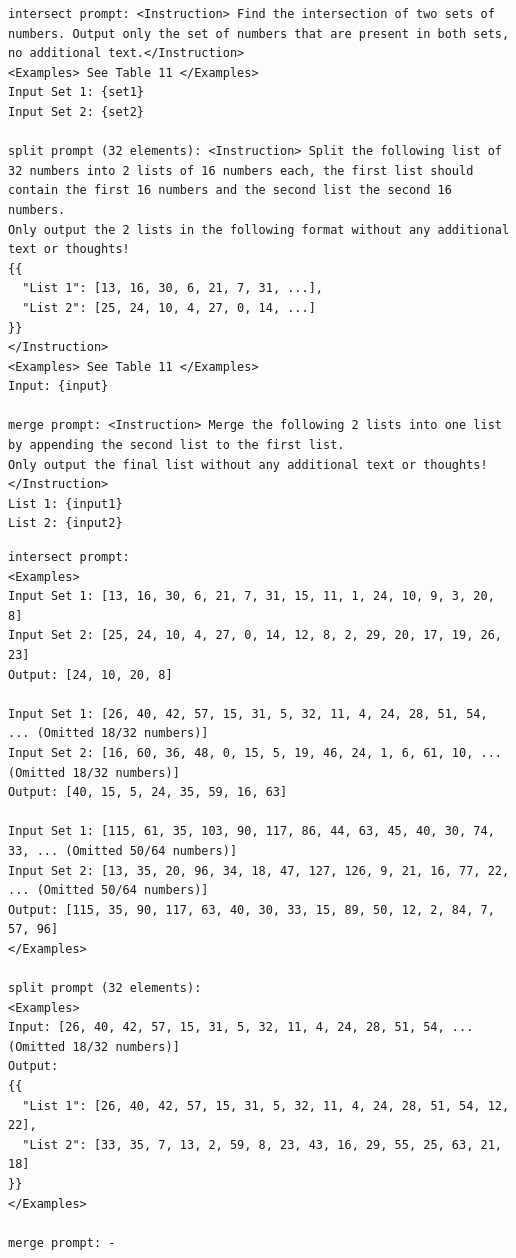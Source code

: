 \documentclass[11pt,UTF8,fontset=fandol]{ctexart}
\begin{document}
\begin{table}[H]\centering
\caption{集合交集任务的提示存根；位于单层花括号中的参数将在运行时被替换。}
\label{tab:10}
\end{table}
\begin{lstlisting}
intersect prompt: <Instruction> Find the intersection of two sets of numbers. Output only the set of numbers that are present in both sets, no additional text.</Instruction>
<Examples> See Table 11 </Examples>
Input Set 1: {set1}
Input Set 2: {set2}

split prompt (32 elements): <Instruction> Split the following list of 32 numbers into 2 lists of 16 numbers each, the first list should contain the first 16 numbers and the second list the second 16 numbers.
Only output the 2 lists in the following format without any additional text or thoughts!
{{
  "List 1": [13, 16, 30, 6, 21, 7, 31, ...],
  "List 2": [25, 24, 10, 4, 27, 0, 14, ...]
}}
</Instruction>
<Examples> See Table 11 </Examples>
Input: {input}

merge prompt: <Instruction> Merge the following 2 lists into one list by appending the second list to the first list.
Only output the final list without any additional text or thoughts! </Instruction>
List 1: {input1}
List 2: {input2}
\end{lstlisting}

\begin{table}[H]\centering
\caption{用于集合交集任务的每个提示的少样本示例；为简洁起见，部分列表被截断。}
\label{tab:11}
\end{table}
\begin{lstlisting}
intersect prompt:
<Examples>
Input Set 1: [13, 16, 30, 6, 21, 7, 31, 15, 11, 1, 24, 10, 9, 3, 20, 8]
Input Set 2: [25, 24, 10, 4, 27, 0, 14, 12, 8, 2, 29, 20, 17, 19, 26, 23]
Output: [24, 10, 20, 8]

Input Set 1: [26, 40, 42, 57, 15, 31, 5, 32, 11, 4, 24, 28, 51, 54, ... (Omitted 18/32 numbers)]
Input Set 2: [16, 60, 36, 48, 0, 15, 5, 19, 46, 24, 1, 6, 61, 10, ... (Omitted 18/32 numbers)]
Output: [40, 15, 5, 24, 35, 59, 16, 63]

Input Set 1: [115, 61, 35, 103, 90, 117, 86, 44, 63, 45, 40, 30, 74, 33, ... (Omitted 50/64 numbers)]
Input Set 2: [13, 35, 20, 96, 34, 18, 47, 127, 126, 9, 21, 16, 77, 22, ... (Omitted 50/64 numbers)]
Output: [115, 35, 90, 117, 63, 40, 30, 33, 15, 89, 50, 12, 2, 84, 7, 57, 96]
</Examples>

split prompt (32 elements):
<Examples>
Input: [26, 40, 42, 57, 15, 31, 5, 32, 11, 4, 24, 28, 51, 54, ... (Omitted 18/32 numbers)]
Output:
{{
  "List 1": [26, 40, 42, 57, 15, 31, 5, 32, 11, 4, 24, 28, 51, 54, 12, 22],
  "List 2": [33, 35, 7, 13, 2, 59, 8, 23, 43, 16, 29, 55, 25, 63, 21, 18]
}}
</Examples>

merge prompt: -
\end{lstlisting}
\end{document}
